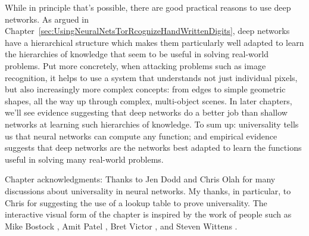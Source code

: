 While in principle that's possible, there are good practical reasons to use deep networks. As argued in Chapter~\ref{sec:UsingNeuralNetsTorRcognizeHandWrittenDigits}, deep networks have a hierarchical structure which makes them particularly well adapted to learn the hierarchies of knowledge that seem to be useful in solving real-world problems. Put more concretely, when attacking problems such as image recognition, it helps to use a system that understands not just individual pixels, but also increasingly more complex concepts: from edges to simple geometric shapes, all the way up through complex, multi-object scenes. In later chapters, we'll see evidence suggesting that deep networks do a better job than shallow networks at learning such hierarchies of knowledge. To sum up: universality tells us that neural networks can compute any function; and empirical evidence suggests that deep networks are the networks best adapted to learn the functions useful in solving many real-world problems.


Chapter acknowledgments: Thanks to Jen Dodd and Chris Olah \cite{chrisolah2019} for many discussions about universality in neural networks. My thanks, in particular, to Chris for suggesting the use of a lookup table to prove universality. The interactive visual form of the chapter is inspired by the work of people such as Mike Bostock \cite{MikeBostock2019}, Amit Patel  \cite{AmitPatel2019}, Bret Victor \cite{BretVictor2019}, and Steven Wittens \cite{StevenWittens2019}. 


